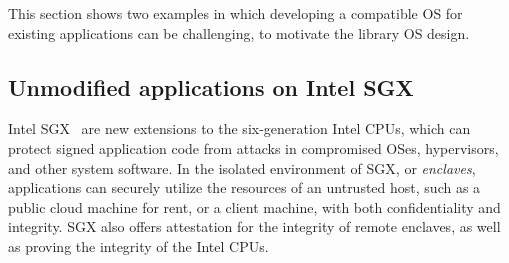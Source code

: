 This section shows two examples in which developing a compatible OS for existing applications can be challenging, to motivate the library OS design.


\subsection{Unmodified applications on Intel SGX}
\label{sec:intro:sgx}

Intel SGX~\cite{intelsgx} are new extensions to the six-generation Intel CPUs,
which can
protect signed application code from attacks in compromised OSes, hypervisors, and other system software.
In the isolated environment of SGX, or {\em enclaves}, applications can securely utilize the
resources of an untrusted host,
such as a public cloud machine for rent, or a client machine,
with both confidentiality and integrity.
SGX also offers attestation for the integrity of remote enclaves, as well as proving the integrity of the Intel CPUs.



